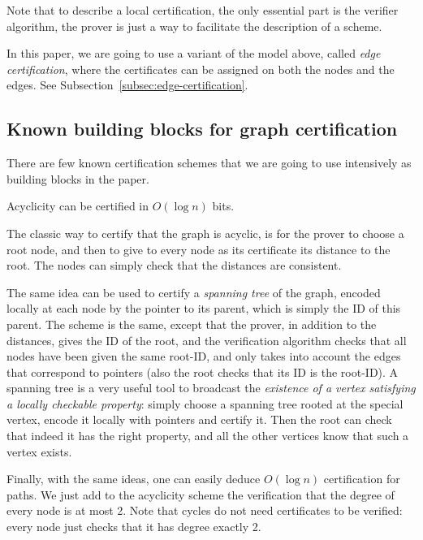\documentclass[a4paper,thm-restate,USenglish]{lipics-v2019}
\begin{document}
Note that to describe a local certification, the only essential part is the verifier algorithm, the prover is just a way to facilitate the description of a scheme.

In this paper, we are going to use a variant of the model above, called \emph{edge certification}, where the certificates can be assigned on both the nodes and the edges. See Subsection~\ref{subsec:edge-certification}.

\subsection{Known building blocks for graph certification}
\label{subsec:building-blocks}

There are few known certification schemes that we are going to use intensively as building blocks in the paper. 
\begin{lemma}
\label{lem:acyclicity}
Acyclicity can be certified in $O(\log n)$ bits.
\end{lemma}

The classic way to certify that the graph is acyclic, is for the prover to choose a root node, and then to give to every node as its certificate its distance to the root. The nodes can simply check that the distances are consistent. 

The same idea can be used to certify a \emph{spanning tree} of the graph, encoded locally at each node by the pointer to its parent, which is simply the ID of this parent. 
The scheme is the same, except that the prover, in addition to the distances, gives the ID of the root, and the verification algorithm  checks that all nodes have been given the same root-ID, and only takes into account the edges that correspond to pointers (also the root checks that its ID is the root-ID).
A spanning tree is a very useful tool to broadcast the \emph{existence of a vertex satisfying a locally checkable property}: simply choose a spanning tree rooted at the special vertex, encode it locally with pointers and certify it. Then the root can check that indeed it has the right property, and all the other vertices know that such a vertex exists.

Finally, with the same ideas, one can easily deduce $O(\log n)$ certification for paths.
We just add to the acyclicity scheme the verification that the degree of every node is at most 2. 
Note that cycles do not need certificates to be verified: every node just checks that it has degree exactly 2.
\end{document}
